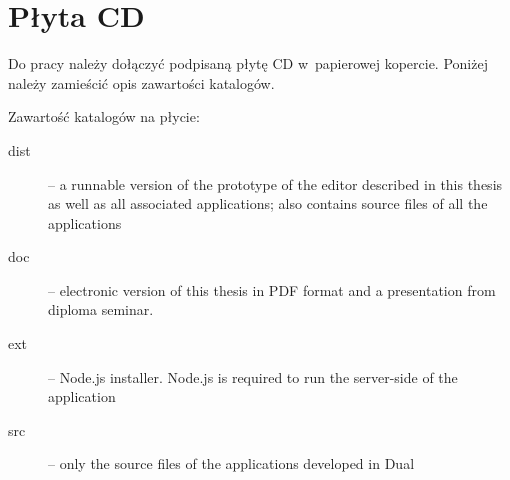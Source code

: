 \chapter{Płyta CD}\label{app:plyta}

\begin{figure}[htb]
\makebox[\textwidth]{\framebox[12.8cm]{\rule{0pt}{12.8cm}}}
\end{figure}
\pagebreak
{\color{red} Do pracy należy dołączyć podpisaną płytę CD w~papierowej
  kopercie.  Poniżej należy zamieścić opis zawartości katalogów.}

Zawartość katalogów na płycie:
\begin{description}
\item[dist] -- a runnable version of the prototype of the editor described in this thesis as well as all associated applications; also contains source files of all the applications %
\item[doc] -- electronic version of this thesis in PDF format and a presentation from
diploma seminar.
\item[ext] -- Node.js installer. Node.js is required to run the server-side of the application
\item[src] -- only the source files of the applications developed in Dual
\end{description}

